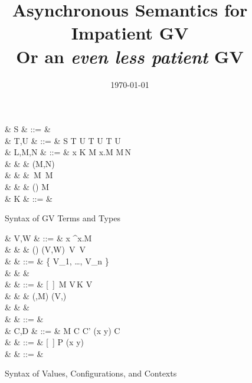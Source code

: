 \documentclass[a4paper]{article}
\title{Asynchronous Semantics for Impatient GV \\ Or an \emph{even less patient} GV}
\date{\today}
\begin{document}
\maketitle

\begin{figure}[float]
\begin{syntax}
   & S & ::= &  \mid {} \mid {} \mid {} \\
   & T,U & ::= & S \mid \one \mid T \gvtimes U \mid \zero \mid T \gvplus U \mid T \lto U
  \\ %
   & L,M,N & ::= & x \mid K \app M \mid \lambda x.M \mid M\,N \\
  & & \mid & (M,N) \mid {} \\
  & & \mid & \,M \mid {}\,M \mid {} \\
  & & \mid & () \mid {} \mid {} \app M \\
   & K & ::= &  \mid {} \mid {} \mid {} \mid {}\\
\end{syntax}
\caption{Syntax of GV Terms and Types}\label{fig:gv-syntax}
\end{figure}

\begin{figure}[float]
\begin{syntax}
   & V,W & ::= & x \mid \lambda^\sigma x.M \\
  & & \mid & () \mid (V,W) \mid {}\,V \mid {}\,V  \\
   & \sigma & ::= & \{  {V_1}, \dots,  {V_n} \} \\
  & & & \qquad{} \\
   & \Ex & ::= &  [~] \mid \Ex\,M \mid V\,\Ex \mid K \app V \mid {} \\
  & & \mid & (\Ex,M) \mid (V,\Ex) \mid {} \\
  & & \mid & \,\Ex \mid {}\,\Ex \mid {} \\
  & \Fx & ::= & \phi \Ex \\
   & C,D & ::= & \phi M \mid C \parallel C' \mid (\nu x y) C \mid {} \\
   & \Cx & ::= & [~] \mid \Cx \parallel P \mid (\nu x y)\Cx \\
   & \phi & ::= & \wcirc \mid \bcirc
\end{syntax}
\caption{Syntax of Values, Configurations, and Contexts}\label{fig:gv-eval-syntax}
\end{figure}
\end{document}
